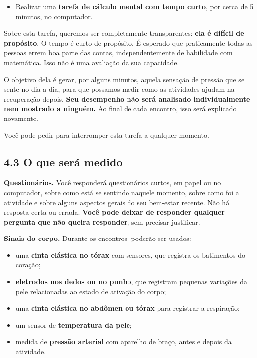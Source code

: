 \documentclass[12pt,a4paper]{article}
\begin{document}
\begin{itemize}
  \item[\textbf{l)}] Realizar uma \textbf{tarefa de cálculo mental com tempo curto}, por cerca de 5 minutos, no computador.
\end{itemize}

Sobre esta tarefa, queremos ser completamente transparentes: \textbf{ela é
difícil de propósito}. O tempo é curto de propósito. É esperado que praticamente
todas as pessoas errem boa parte das contas, independentemente de habilidade com
matemática. Isso não é uma avaliação da sua capacidade.

O objetivo dela é gerar, por alguns minutos, aquela sensação de pressão que se
sente no dia a dia, para que possamos medir como as atividades ajudam na
recuperação depois. \textbf{Seu desempenho não será analisado individualmente
nem mostrado a ninguém.} Ao final de cada encontro, isso será explicado
novamente.

Você pode pedir para interromper esta tarefa a qualquer momento.

\subsection*{4.3 O que será medido}

\textbf{Questionários.} Você responderá questionários curtos, em papel ou no
computador, sobre como está se sentindo naquele momento, sobre como foi a
atividade e sobre alguns aspectos gerais do seu bem-estar recente. Não há
resposta certa ou errada. \textbf{Você pode deixar de responder qualquer
pergunta que não queira responder}, sem precisar justificar.

\textbf{Sinais do corpo.} Durante os encontros, poderão ser usados:

\begin{itemize}
  \item uma \textbf{cinta elástica no tórax} com sensores, que registra os batimentos do coração;
  \item \textbf{eletrodos nos dedos ou no punho}, que registram pequenas variações da pele relacionadas ao estado de ativação do corpo;
  \item uma \textbf{cinta elástica no abdômen ou tórax} para registrar a respiração;
  \item um sensor de \textbf{temperatura da pele};
  \item medida de \textbf{pressão arterial} com aparelho de braço, antes e depois da atividade.
\end{itemize}
\end{document}
